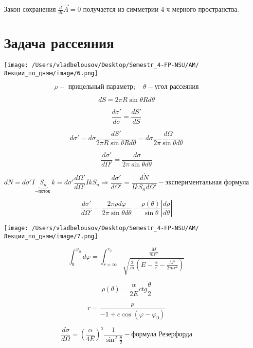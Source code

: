 \documentclass[12pt, a4paper]{report}
\begin{document}
Закон сохранения \( \displaystyle  \frac{d}{dt } \vec{A }  =0  \) получается из симметрии 4-ч мерного пространства.

\section{Задача рассеяния }

\begin{center}
    \texttt{[image: /Users/vladbelousov/Desktop/Semestr\_4-FP-NSU/АМ/Лекции\_по\_дням/image/6.png]}
\end{center}

\[ \rho - \text{ прицельный параметр} ; \quad  \theta - \text{угол рассеяния}   \] 

\[ dS = 2 \pi R \sin  \theta R d \theta \] 

\[ \frac{d \sigma'}{d \sigma} = \frac{d S ' }{ dS }   \] 

\[ d \sigma ' = d \sigma \frac{dS'}{2 \pi R \sin \theta R d \theta  } = d \sigma \frac{d \Omega}{2 \pi \sin \theta d \theta }  \] 

\[ \frac{d \sigma ' }{ d \Omega '} = \frac{d \sigma }{2 \pi \sin \theta d \theta}  \] 

\[ d\dot{N } = d \sigma ' I \underbrace{S_n}_{-\text{поток } } k=d \sigma ' \frac{d \Omega' }{d \Omega ' }I k S_n \Rightarrow \frac{d \sigma '}{d \Omega '} = \frac{d\dot{N} }{Ik S_n d \Omega'}  -\text{экспериментальная формула}   \] 

\[ \frac{d \sigma ' }{d \Omega ' } = \frac{2 \pi \rho d \varphi }{2 \pi \sin \theta d \theta } = \frac{\rho (\theta )}{\sin \theta } \left\lvert \frac{d \rho }{d \theta }  \right\rvert   \] 

\begin{center}
    \texttt{[image: /Users/vladbelousov/Desktop/Semestr\_4-FP-NSU/АМ/Лекции\_по\_дням/image/7.png]}
\end{center}

\[ \int_{0}^{\varphi_0 }d \varphi = \int_{r=\infty }^{r_0 } \frac{ \frac{ M }{mr ^2 } }{\sqrt{\frac{2}{m } \left( E  - \frac{\alpha}{r }  - \frac{M ^2 }{2 m r ^2 }  \right)}}    \] 

\[ \rho( \theta ) = \frac{\alpha}{2 E }  ctg \frac{\theta}{2}  \] 

\[ r= \frac{ p }{-1 +e \cos (\varphi- \varphi_0 )}  \] 

\[   \frac{d \sigma }{d \Omega } = \left(  \frac{\alpha}{ 4 E }    \right) ^2 \frac{1}{\sin ^2  \frac{\theta}{2} }  - \text{формула Резерфорда}  \] 
\end{document}
